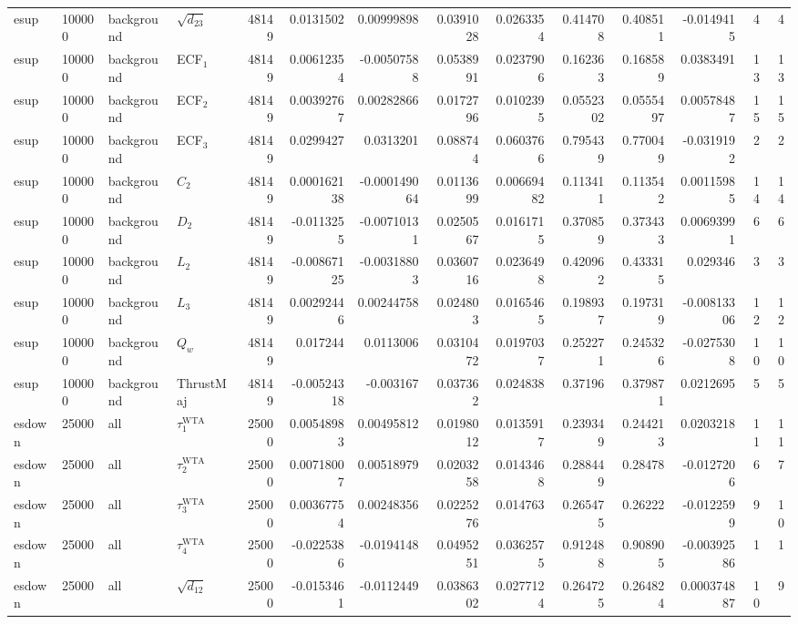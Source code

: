 \begin{landscape}
\begin{longtable}{llll r rrrr rr r rr}
esup & 100000 & background & $\sqrt{d_{23}}$ & 48149 & 0.0131502 & 0.00999898 & 0.0391028 & 0.0263354 & 0.414708 & 0.408511 & -0.0149415 & 4 & 4 \\
esup & 100000 & background & ECF$_1$ & 48149 & 0.00612354 & -0.00507588 & 0.0538991 & 0.0237906 & 0.162363 & 0.168589 & 0.0383491 & 13 & 13 \\
esup & 100000 & background & ECF$_2$ & 48149 & 0.00392767 & 0.00282866 & 0.0172796 & 0.0102395 & 0.0552302 & 0.0555497 & 0.00578487 & 15 & 15 \\
esup & 100000 & background & ECF$_3$ & 48149 & 0.0299427 & 0.0313201 & 0.088744 & 0.0603766 & 0.795439 & 0.770049 & -0.0319192 & 2 & 2 \\
esup & 100000 & background & $C_2$ & 48149 & 0.000162138 & -0.000149064 & 0.0113699 & 0.00669482 & 0.113411 & 0.113542 & 0.00115985 & 14 & 14 \\
esup & 100000 & background & $D_2$ & 48149 & -0.0113255 & -0.00710131 & 0.0250567 & 0.0161715 & 0.370859 & 0.373433 & 0.00693991 & 6 & 6 \\
esup & 100000 & background & $L_2$ & 48149 & -0.00867125 & -0.00318803 & 0.0360716 & 0.0236498 & 0.420962 & 0.433315 & 0.029346 & 3 & 3 \\
esup & 100000 & background & $L_3$ & 48149 & 0.00292446 & 0.00244758 & 0.024803 & 0.0165465 & 0.198937 & 0.197319 & -0.00813306 & 12 & 12 \\
esup & 100000 & background & $Q_w$ & 48149 & 0.017244 & 0.0113006 & 0.0310472 & 0.0197037 & 0.252271 & 0.245326 & -0.0275308 & 10 & 10 \\
esup & 100000 & background & ThrustMaj & 48149 & -0.00524318 & -0.003167 & 0.037362 & 0.024838 & 0.37196 & 0.379871 & 0.0212695 & 5 & 5 \\
esdown & 25000 & all & $\tau_1^{\mathrm{WTA}}$ & 25000 & 0.00548983 & 0.00495812 & 0.0198012 & 0.0135917 & 0.239349 & 0.244213 & 0.0203218 & 11 & 11 \\
esdown & 25000 & all & $\tau_2^{\mathrm{WTA}}$ & 25000 & 0.00718007 & 0.00518979 & 0.0203258 & 0.0143468 & 0.288449 & 0.28478 & -0.0127206 & 6 & 7 \\
esdown & 25000 & all & $\tau_3^{\mathrm{WTA}}$ & 25000 & 0.00367754 & 0.00248356 & 0.0225276 & 0.014763 & 0.265475 & 0.26222 & -0.0122599 & 9 & 10 \\
esdown & 25000 & all & $\tau_4^{\mathrm{WTA}}$ & 25000 & -0.0225386 & -0.0194148 & 0.0495251 & 0.0362575 & 0.912488 & 0.908905 & -0.00392586 & 1 & 1 \\
esdown & 25000 & all & $\sqrt{d_{12}}$ & 25000 & -0.0153461 & -0.0112449 & 0.0386302 & 0.0277124 & 0.264725 & 0.264824 & 0.000374887 & 10 & 9 \\

\end{longtable}
\end{landscape}
